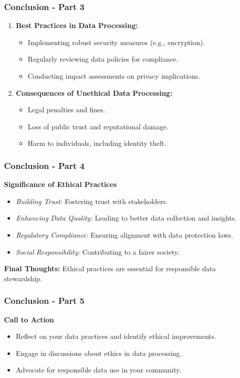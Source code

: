 \documentclass[aspectratio=169]{beamer}
\begin{document}
\begin{frame}[fragile]
    \frametitle{Conclusion - Part 3}
    \begin{enumerate}[resume]
        \item \textbf{Best Practices in Data Processing:}
        \begin{itemize}
            \item Implementing robust security measures (e.g., encryption).
            \item Regularly reviewing data policies for compliance.
            \item Conducting impact assessments on privacy implications.
        \end{itemize}
        \item \textbf{Consequences of Unethical Data Processing:}
        \begin{itemize}
            \item Legal penalties and fines.
            \item Loss of public trust and reputational damage.
            \item Harm to individuals, including identity theft.
        \end{itemize}
    \end{enumerate}
\end{frame}

\begin{frame}[fragile]
    \frametitle{Conclusion - Part 4}
    \textbf{Significance of Ethical Practices}
    \begin{itemize}
        \item \textit{Building Trust:} Fostering trust with stakeholders.
        \item \textit{Enhancing Data Quality:} Leading to better data collection and insights.
        \item \textit{Regulatory Compliance:} Ensuring alignment with data protection laws.
        \item \textit{Social Responsibility:} Contributing to a fairer society.
    \end{itemize}

    \textbf{Final Thoughts:} 
    Ethical practices are essential for responsible data stewardship.
\end{frame}

\begin{frame}[fragile]
    \frametitle{Conclusion - Part 5}
    \textbf{Call to Action}
    \begin{itemize}
        \item Reflect on your data practices and identify ethical improvements.
        \item Engage in discussions about ethics in data processing.
        \item Advocate for responsible data use in your community.
    \end{itemize}
\end{frame}
\end{document}
